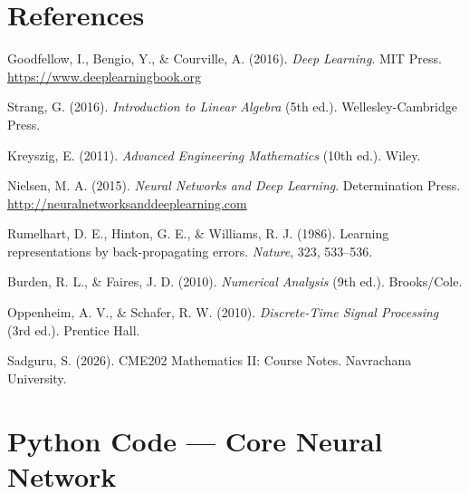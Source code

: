 \documentclass[12pt,a4paper]{article}
\begin{document}
\newpage

\section*{References}

\begin{enumerate}[leftmargin=2em, label={[\arabic*]}, itemsep=4pt]
  \item Goodfellow, I., Bengio, Y., \& Courville, A. (2016). \textit{Deep Learning}. MIT Press. \url{https://www.deeplearningbook.org}

  \item Strang, G. (2016). \textit{Introduction to Linear Algebra} (5th ed.). Wellesley-Cambridge Press.

  \item Kreyszig, E. (2011). \textit{Advanced Engineering Mathematics} (10th ed.). Wiley.

  \item Nielsen, M. A. (2015). \textit{Neural Networks and Deep Learning}. Determination Press. \url{http://neuralnetworksanddeeplearning.com}

  \item Rumelhart, D. E., Hinton, G. E., \& Williams, R. J. (1986). Learning representations by back-propagating errors. \textit{Nature}, 323, 533--536.

  \item Burden, R. L., \& Faires, J. D. (2010). \textit{Numerical Analysis} (9th ed.). Brooks/Cole.

  \item Oppenheim, A. V., \& Schafer, R. W. (2010). \textit{Discrete-Time Signal Processing} (3rd ed.). Prentice Hall.

  \item Sadguru, S. (2026). CME202 \textendash{} Mathematics II: Course Notes. Navrachana University.
\end{enumerate}

\newpage

\appendix
\section{Python Code --- Core Neural Network}
\end{document}
